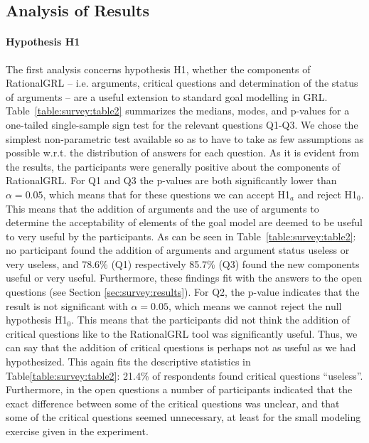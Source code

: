 \subsection{Analysis of Results}\label{sect:validation:analysis}

\paragraph{Hypothesis H1}
The first analysis concerns hypothesis H1, whether the components of RationalGRL -- i.e. arguments, critical questions and determination of the status of arguments -- are a useful extension to standard goal modelling in GRL. Table~\ref{table:survey:table2} summarizes the medians, modes, and p-values for a one-tailed single-sample sign test for the relevant questions Q1-Q3. We chose the simplest non-parametric test available so as to have to take as few assumptions as possible w.r.t. the distribution of answers for each question. As it is evident from the results, the participants were generally positive about the components of RationalGRL. For Q1 and Q3 the p-values are both significantly lower than $\alpha = 0.05$, which means that for these questions we can accept H1$_{a}$ and reject H1$_{0}$. This means that the addition of arguments and the use of arguments to determine the acceptability of elements of the goal model are deemed to be useful to very useful by the participants. As can be seen in Table~\ref{table:survey:table2}: no participant found the addition of arguments and argument status useless or very useless, and 78.6\% (Q1) respectively 85.7\% (Q3) found the new components useful or very useful. Furthermore, these findings fit with the answers to the open questions (see Section \ref{sec:survey:results}). For Q2, the p-value indicates that the result is not significant with $\alpha = 0.05$, which means we cannot reject the null hypothesis H1$_{0}$. This means that the participants did not think the addition of critical questions like to the RationalGRL tool was significantly useful. Thus, we can say that the addition of critical questions is perhaps not as useful as we had hypothesized. This again fits the descriptive statistics in Table\ref{table:survey:table2}: 21.4\% of respondents found critical questions ``useless''. Furthermore, in the open questions a number of participants indicated that the exact difference between some of the critical questions was unclear, and that some of the critical questions seemed unnecessary, at least for the small modeling exercise given in the experiment.


